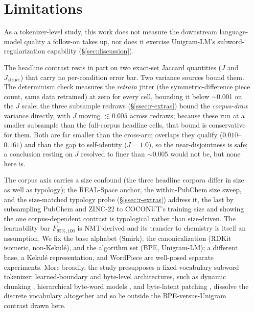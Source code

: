 \documentclass{article}
\begin{document}
\section{Limitations}\label{sec:limitations}

As a tokenizer-level study, this work does not measure the downstream
language-model quality a follow-on takes up, nor does it
exercise Unigram-LM's subword-regularization capability (\S\ref{sec:discussion}).

The headline contrast rests in part on two exact-set Jaccard quantities ($J$ and
$J_{\mathrm{struct}}$) that carry no per-condition error bar. Two variance
sources bound them. The determinism check measures the \emph{retrain} jitter
(the symmetric-difference piece count, same data retrained) at zero for every
cell, bounding it below $\sim$0.001 on the $J$ scale; the three subsample redraws
(\S\ref{ssec:r-extras}) bound the \emph{corpus-draw} variance directly, with
$J$ moving $\lesssim 0.005$ across redraws; because these run at a smaller
subsample than the full-corpus headline cells, that bound is conservative for
them. Both are far smaller
than the cross-arm overlaps they qualify ($0.010$--$0.161$) and than the gap to
self-identity ($J{=}1.0$), so the near-disjointness is safe; a conclusion resting
on $J$ resolved to finer than $\sim$0.005 would not be, but none here is.

The corpus axis
carries a size confound (the three headline corpora differ in size as well
as typology); the REAL-Space anchor, the within-PubChem size sweep, and
the size-matched typology probe (\S\ref{ssec:r-extras}) address it, the
last by subsampling PubChem and ZINC-22 to COCONUT's training size and
showing the one corpus-dependent contrast is typological rather than
size-driven. The learnability bar $F_{95\%,100}$ is
NMT-derived \citep{gowda2020optimal-vocab-nmt} and its transfer to
chemistry is itself an assumption. We fix the base alphabet
(Smirk), the canonicalization (RDKit isomeric, non-Kekul\'e), and the
algorithm set (BPE, Unigram-LM); a different base, a Kekul\'e
representation, and WordPiece are well-posed separate experiments. More
broadly, the study presupposes a fixed-vocabulary subword tokenizer;
learned-boundary and byte-level architectures, such as dynamic chunking
\citep{hwang2025dynamic-chunking-hnet}, hierarchical byte-word models
\citep{neitemeier2025hierarchical-autoregressive}, and byte-latent patching
\citep{pagnoni2024byte-latent-transformer}, dissolve the discrete vocabulary
altogether and so lie outside the BPE-versus-Unigram contrast drawn here.
\end{document}
